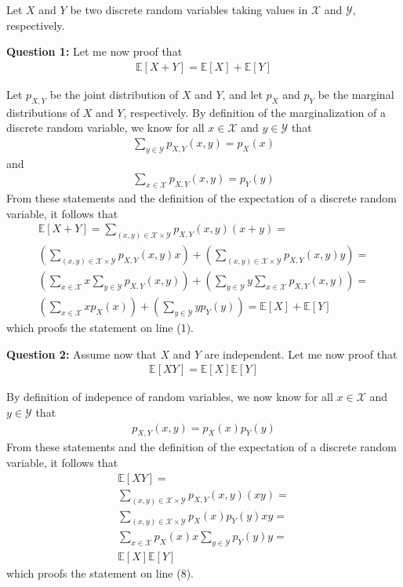 Let $X$ and $Y$ be two discrete random variables taking values in $\mathcal{X}$ and $\mathcal{Y}$, respectively.

\textbf{Question 1:} Let me now proof that
\begin{align}
\mathbb{E}[X + Y] = \mathbb{E}[X] + \mathbb{E}[Y]
\end{align}

Let $p_{X,Y}$ be the joint distribution of $X$ and $Y$, and let $p_X$ and $p_Y$ be the marginal distributions of $X$ and $Y$, respectively. By definition of the marginalization of a discrete random variable, we know for all $x \in \mathcal{X}$ and $y \in \mathcal{Y}$ that
\begin{align}
\sum_{y \in \mathcal{Y}} p_{X,Y}(x,y) = p_X(x)
\end{align}
and
\begin{align}
\sum_{x \in \mathcal{X}} p_{X,Y}(x,y) = p_Y(y)
\end{align}
From these statements and the definition of the expectation of a discrete random variable, it follows that 
\begin{align}
\mathbb{E}[X + Y] = \sum_{(x,y) \in \mathcal{X}\times \mathcal{Y}} p_{X,Y}(x,y)(x+y) = \\ 
\left( \sum_{(x,y) \in \mathcal{X}\times \mathcal{Y}} p_{X,Y}(x,y)x \right) + \left( \sum_{(x,y) \in \mathcal{X}\times \mathcal{Y}}p_{X,Y}(x,y)y \right) = \\ 
\left( \sum_{x \in \mathcal{X}} x \sum_{y \in \mathcal{Y}} p_{X,Y}(x,y) \right) + \left( \sum_{y \in \mathcal{Y}} y \sum_{x \in \mathcal{X}} p_{X,Y}(x,y) \right) = \\ 
\left( \sum_{x \in \mathcal{X}} x p_X(x) \right) + \left( \sum_{y \in \mathcal{Y}} y p_Y(y) \right) = \mathbb{E}[X] + \mathbb{E}[Y]
\end{align}
which proofs the statement on line (1).

\textbf{Question 2:} Assume now that $X$ and $Y$ are independent. Let me now proof that
\begin{align}
\mathbb{E}[XY] = \mathbb{E}[X]\mathbb{E}[Y]
\end{align}

By definition of indepence of random variables, we now know for all $x \in \mathcal{X}$ and $y \in \mathcal{Y}$ that 
\begin{align}
p_{X,Y}(x,y) = p_X(x)p_Y(y)
\end{align}
From these statements and the definition of the expectation of a discrete random variable, it follows that 
\begin{align}
\mathbb{E}[XY] = \\ \sum_{(x,y) \in \mathcal{X}\times \mathcal{Y}} p_{X,Y}(x,y)(xy) = \\
\sum_{(x,y) \in \mathcal{X}\times \mathcal{Y}} p_X(x)p_Y(y)xy = \\ 
\sum_{x \in \mathcal{X}} p_X(x)x \sum_{y \in \mathcal{Y}} p_Y(y)y = \\
\mathbb{E}[X]\mathbb{E}[Y]
\end{align}
which proofs the statement on line (8).


